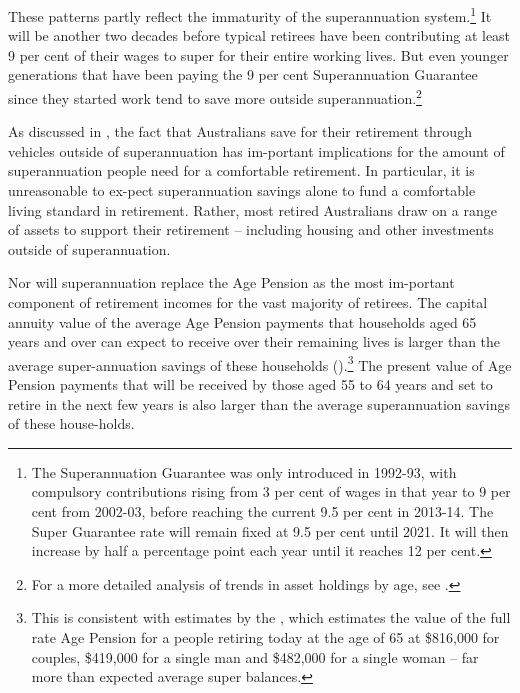 \documentclass{grattanAlpha}
\begin{document}
These patterns partly reflect the immaturity of the superannuation system.\footnote{%
The Superannuation Guarantee was only introduced in 1992-93, with compulsory contributions rising from 3 per cent of wages in that year to 9 per cent from 2002-03, before reaching the current 9.5 per cent in 2013-14. The Super Guarantee rate will remain fixed at 9.5 per cent until 2021. It will then increase by half a percentage point each year until it reaches 12 per cent. 
} It will be another two decades before typical retirees have been contributing at least 9 per cent of their wages to super for their entire working lives. But even younger generations that have been paying the 9 per cent Superannuation Guarantee since they started work tend to save more outside superannuation.\footnote{For a more detailed analysis of trends in asset holdings by age, see \textcite[][14]{DaleyWoodWeidmannEtAl2014}.}  


As discussed in , the fact that Australians save for their retirement through vehicles outside of superannuation has im-portant implications for the amount of superannuation people need for a comfortable retirement. In particular, it is unreasonable to ex-pect superannuation savings alone to fund a comfortable living standard in retirement. Rather, most retired Australians draw on a range of assets to support their retirement – including housing and other investments outside of superannuation. 

Nor will superannuation replace the Age Pension as the most im-portant component of retirement incomes for the vast majority of retirees. The capital annuity value of the average Age Pension payments that households aged 65 years and over can expect to receive over their remaining lives is larger than the average super-annuation savings of these households ().\footnote{This is consistent with estimates by the \textcite[][7]{ActuariesInstitute2015RetirementIncomes}, which estimates the value of the full rate Age Pension for a people retiring today at the age of 65 at \$816,000 for couples, \$419,000 for a single man and \$482,000 for a single woman – far more than expected average super balances.} The present value of Age Pension payments that will be received by those aged 55 to 64 years and set to retire in the next few years is also larger than the average superannuation savings of these house-holds. 
\end{document}
